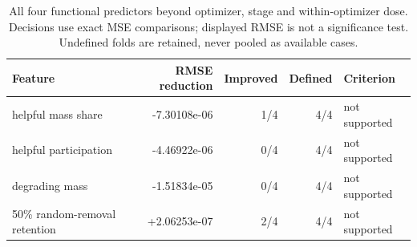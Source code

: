 {\begin{table}[t]
\end{table}
\begin{table}[t]
\centering\small
\begin{tabular}{lrrrl}\toprule
Feature & RMSE reduction & Improved & Defined & Criterion \\
\midrule
helpful mass share & -7.30108e-06 & 1/4 & 4/4 & not supported \\
helpful participation & -4.46922e-06 & 0/4 & 4/4 & not supported \\
degrading mass & -1.51834e-05 & 0/4 & 4/4 & not supported \\
50\% random-removal retention & +2.06253e-07 & 2/4 & 4/4 & not supported \\
\bottomrule\end{tabular}
\caption{All four functional predictors beyond optimizer, stage and within-optimizer dose. Decisions use exact MSE comparisons; displayed RMSE is not a significance test. Undefined folds are retained, never pooled as available cases.}
\end{table}%
}
